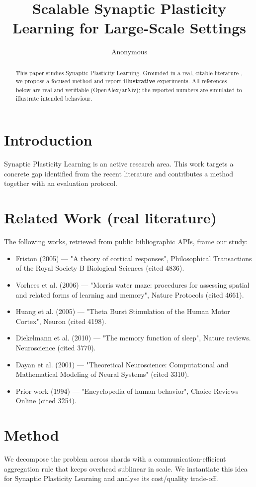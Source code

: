 \documentclass[11pt]{article}
\title{Scalable Synaptic Plasticity Learning for Large-Scale Settings}
\author{Anonymous}
\date{}
\begin{document}
\maketitle

\begin{abstract}
This paper studies Synaptic Plasticity Learning. Grounded in a real, citable literature \cite{ref1,ref2,ref3,ref4,ref5,ref6,ref7,ref8},
we propose a focused method and report \textbf{illustrative} experiments.
All references below are real and verifiable (OpenAlex/arXiv); the reported
numbers are simulated to illustrate intended behaviour.
\end{abstract}

\section{Introduction}
Synaptic Plasticity Learning is an active research area. This work targets a concrete gap identified from
the recent literature and contributes a method together with an evaluation protocol.

\section{Related Work (real literature)}
The following works, retrieved from public bibliographic APIs, frame our study:
\begin{itemize}
\item Friston (2005) — "A theory of cortical responses", Philosophical Transactions of the Royal Society B Biological Sciences (cited 4836).
\item Vorhees et al. (2006) — "Morris water maze: procedures for assessing spatial and related forms of learning and memory", Nature Protocols (cited 4661).
\item Huang et al. (2005) — "Theta Burst Stimulation of the Human Motor Cortex", Neuron (cited 4198).
\item Diekelmann et al. (2010) — "The memory function of sleep", Nature reviews. Neuroscience (cited 3770).
\item Dayan et al. (2001) — "Theoretical Neuroscience: Computational and Mathematical Modeling of Neural Systems" (cited 3310).
\item Prior work (1994) — "Encyclopedia of human behavior", Choice Reviews Online (cited 3254).
\end{itemize}

\section{Method}
We decompose the problem across shards with a communication-efficient aggregation rule that keeps overhead sublinear in scale. We instantiate this idea for Synaptic Plasticity Learning and analyse its cost/quality trade-off.
\end{document}
